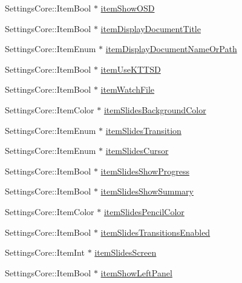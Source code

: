 \begin{DoxyCompactItemize}
\item 
Settings\+Core\+::\+Item\+Bool $\ast$ \hyperlink{classOkular_1_1SettingsPrivate_a27f1970c3866f47ce57e6652f0ac0a44}{item\+Show\+O\+S\+D}
\item 
Settings\+Core\+::\+Item\+Bool $\ast$ \hyperlink{classOkular_1_1SettingsPrivate_a77ac0114dc2afc51a248c5facd23f992}{item\+Display\+Document\+Title}
\item 
Settings\+Core\+::\+Item\+Enum $\ast$ \hyperlink{classOkular_1_1SettingsPrivate_a4010969bd67d27abbe14bad23b7ed77f}{item\+Display\+Document\+Name\+Or\+Path}
\item 
Settings\+Core\+::\+Item\+Bool $\ast$ \hyperlink{classOkular_1_1SettingsPrivate_a7d38a20ebf03326af44123c9fcb72688}{item\+Use\+K\+T\+T\+S\+D}
\item 
Settings\+Core\+::\+Item\+Bool $\ast$ \hyperlink{classOkular_1_1SettingsPrivate_a3af381a9ba48af46f9038813673f0a12}{item\+Watch\+File}
\item 
Settings\+Core\+::\+Item\+Color $\ast$ \hyperlink{classOkular_1_1SettingsPrivate_a2cfd2167d51655fece5c5e64633f82f6}{item\+Slides\+Background\+Color}
\item 
Settings\+Core\+::\+Item\+Enum $\ast$ \hyperlink{classOkular_1_1SettingsPrivate_a8bffe2ed1e53f170465d9061dc123361}{item\+Slides\+Transition}
\item 
Settings\+Core\+::\+Item\+Enum $\ast$ \hyperlink{classOkular_1_1SettingsPrivate_ad81b5a683ded63607aea2c7f64cab5d6}{item\+Slides\+Cursor}
\item 
Settings\+Core\+::\+Item\+Bool $\ast$ \hyperlink{classOkular_1_1SettingsPrivate_aa017e69102f9826cab17015728a06d0e}{item\+Slides\+Show\+Progress}
\item 
Settings\+Core\+::\+Item\+Bool $\ast$ \hyperlink{classOkular_1_1SettingsPrivate_a3cc39edeb6b2f692db32b97836ad4c95}{item\+Slides\+Show\+Summary}
\item 
Settings\+Core\+::\+Item\+Color $\ast$ \hyperlink{classOkular_1_1SettingsPrivate_a4d6faac7ea37d6afa709d3e4ed5f28b0}{item\+Slides\+Pencil\+Color}
\item 
Settings\+Core\+::\+Item\+Bool $\ast$ \hyperlink{classOkular_1_1SettingsPrivate_aa0f6efe7077aeadbdbcbfa55afbf59e4}{item\+Slides\+Transitions\+Enabled}
\item 
Settings\+Core\+::\+Item\+Int $\ast$ \hyperlink{classOkular_1_1SettingsPrivate_af4950dce8d281ec9e8531fed303d3851}{item\+Slides\+Screen}
\item 
Settings\+Core\+::\+Item\+Bool $\ast$ \hyperlink{classOkular_1_1SettingsPrivate_ae2114c36e09aec98410ed23e0269ff98}{item\+Show\+Left\+Panel}

\end{DoxyCompactItemize}
